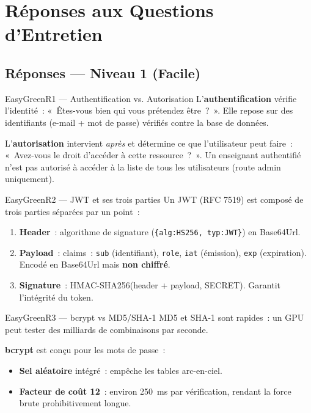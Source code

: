 \documentclass[12pt,a4paper,oneside]{report}
\begin{document}
\newpage


\chapter*{Réponses aux Questions d'Entretien}
\label{ch:reponses}

\section*{\textcolor{EasyGreen}{Réponses --- Niveau 1 (Facile)}}

\begin{qbox}{EasyGreen}{R1 --- Authentification vs. Autorisation}
L'\textbf{authentification} vérifie l'identité~: «~Êtes-vous bien qui
vous prétendez être~?~». Elle repose sur des identifiants (e-mail + mot
de passe) vérifiés contre la base de données.

L'\textbf{autorisation} intervient \textit{après} et détermine ce que
l'utilisateur peut faire~: «~Avez-vous le droit d'accéder à cette
ressource~?~». Un enseignant authentifié n'est pas autorisé à accéder
à la liste de tous les utilisateurs (route admin uniquement).
\end{qbox}

\begin{qbox}{EasyGreen}{R2 --- JWT et ses trois parties}
Un JWT (RFC 7519) est composé de trois parties séparées par un point~:
\begin{enumerate}
  \item \textbf{Header}~: algorithme de signature
        (\texttt{\{alg:HS256, typ:JWT\}}) en Base64Url.
  \item \textbf{Payload}~: claims~: \texttt{sub} (identifiant),
        \texttt{role}, \texttt{iat} (émission), \texttt{exp}
        (expiration). Encodé en Base64Url mais \textbf{non chiffré}.
  \item \textbf{Signature}~: HMAC-SHA256(header + payload, SECRET).
        Garantit l'intégrité du token.
\end{enumerate}
\end{qbox}

\begin{qbox}{EasyGreen}{R3 --- bcrypt vs MD5/SHA-1}
MD5 et SHA-1 sont rapides~: un GPU peut tester des milliards de
combinaisons par seconde.

\textbf{bcrypt} est conçu pour les mots de passe~:
\begin{itemize}
  \item \textbf{Sel aléatoire} intégré~: empêche les tables arc-en-ciel.
  \item \textbf{Facteur de coût 12}~: environ 250~ms par vérification,
        rendant la force brute prohibitivement longue.
\end{itemize}
\end{qbox}
\end{document}
